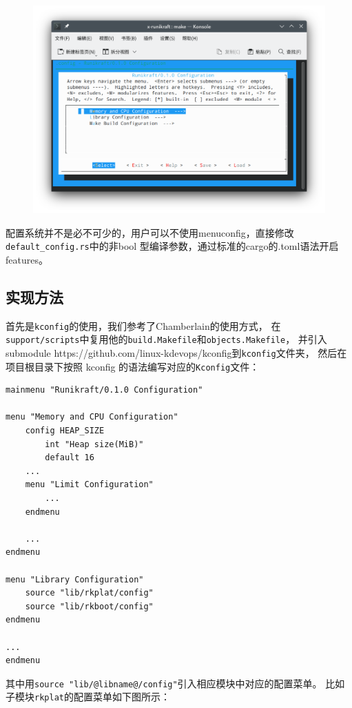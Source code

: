 \documentclass{../runikraft-report}
\begin{document}
\begin{figure}[H]
\centering
\includegraphics[width=0.8\linewidth]{assets/runikraft-menuconfig-1.png}
\caption{}
\label{fig:runikraft-menuconfig-1}
\end{figure}

配置系统并不是必不可少的，用户可以不使用menuconfig，直接修改\texttt{default\_config.rs}中的非bool
型编译参数，通过标准的cargo的.toml语法开启features。

\subsection{实现方法}

首先是\texttt{kconfig}的使用，我们参考了Chamberlain\cite{bib:kconfig}的使用方式，
在\texttt{support/scripts}中复用他的\texttt{build.Makefile}和\texttt{objects.Makefile}，
并引入 submodule https://github.com/linux-kdevops/kconfig到\texttt{kconfig}文件夹，
然后在项目根目录下按照 kconfig 的语法编写对应的\texttt{Kconfig}文件：

\begin{lstlisting}
mainmenu "Runikraft/0.1.0 Configuration"

menu "Memory and CPU Configuration"
    config HEAP_SIZE
        int "Heap size(MiB)"
        default 16
    ...
    menu "Limit Configuration"
        ...
    endmenu

    ...
endmenu

menu "Library Configuration"
    source "lib/rkplat/config"
	source "lib/rkboot/config"
endmenu

...
endmenu
\end{lstlisting}

其中用\texttt{source "lib/@libname@/config"}引入相应模块中对应的配置菜单。
比如子模块\texttt{rkplat}的配置菜单如下图所示：
\end{document}
